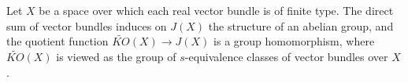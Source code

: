 Let $X$ be a space over which each real vector bundle is of finite type. The direct sum of vector bundles induces on $J(X)$ the structure of an abelian group, and the quotient function $\widetilde{KO}(X) \rightarrow J(X)$ is a group homomorphism, where $\widetilde{KO}(X)$ is viewed as the group of $s$-equivalence classes of vector bundles over $X$.
